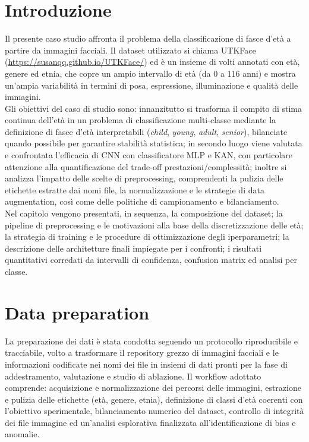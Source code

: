\documentclass[a4paper,12pt]{report}
\begin{document}
	\section{Introduzione}
	Il presente caso studio affronta il problema della classificazione di fasce d'età a partire da immagini facciali. Il dataset utilizzato si chiama UTKFace (\url{https://susanqq.github.io/UTKFace/}) ed è un insieme di volti annotati con età, genere ed etnia, che copre un ampio intervallo di età (da 0 a 116 anni) e mostra un'ampia variabilità in termini di posa, espressione, illuminazione e qualità delle immagini. \\
	Gli obiettivi del caso di studio sono: innanzitutto si trasforma il compito di stima continua dell'età in un problema di classificazione multi-classe mediante la definizione di fasce d'età interpretabili (\textit{child}, \textit{young}, \textit{adult}, \textit{senior}), bilanciate quando possibile per garantire stabilità statistica; in secondo luogo viene valutata e confrontata l'efficacia di CNN con classificatore MLP e KAN, con particolare attenzione alla quantificazione del trade-off prestazioni/complessità; inoltre si analizza l'impatto delle scelte di preprocessing, comprendenti la pulizia delle etichette estratte dai nomi file, la normalizzazione e le strategie di data augmentation, così come delle politiche di campionamento e bilanciamento. \\
	Nel capitolo vengono presentati, in sequenza, la composizione del dataset; la pipeline di preprocessing e le motivazioni alla base della discretizzazione delle età; la strategia di training e le procedure di ottimizzazione degli iperparametri; la descrizione delle architetture finali impiegate per i confronti; i risultati quantitativi corredati da intervalli di confidenza, confusion matrix ed analisi per classe.
	
	\section{Data preparation}
	
	La preparazione dei dati è stata condotta seguendo un protocollo riproducibile e tracciabile, volto a trasformare il repository grezzo di immagini facciali e le informazioni codificate nei nomi dei file in insiemi di dati pronti per la fase di addestramento, valutazione e studio di ablazione. Il workflow adottato comprende: acquisizione e normalizzazione dei percorsi delle immagini, estrazione e pulizia delle etichette (età, genere, etnia), definizione di classi d'età coerenti con l'obiettivo sperimentale, bilanciamento numerico del dataset, controllo di integrità dei file immagine ed un'analisi esplorativa finalizzata all'identificazione di bias e anomalie.
	
\end{document}
